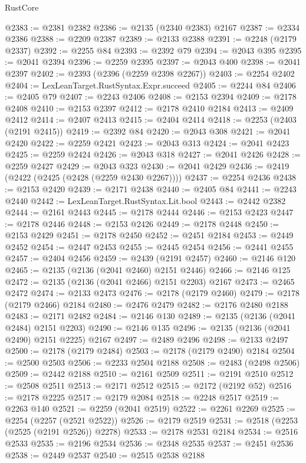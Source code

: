 \begin{lexlean}{RustCore}
\begin{coremodule}
@2383 := @2381 @2382
@2386 := @2135 (@2340 @2383) @2167
@2387 := @2334 @2386
@2388 := @2209 @2387
@2389 := @2133 @2388
@2391 := @2248 (@2179 @2337)
@2392 := @2255 @84
@2393 := @2392 @79
@2394 := @2043 @395
@2395 := @2041 @2394
@2396 := @2259 @2395
@2397 := @2043 @400
@2398 := @2041 @2397
@2402 := @2393 (@2396 (@2259 @2398 @2267))
@2403 := @2254 @2402
@2404 := LexLeanTarget.RustSyntax.Expr.succeed
@2405 := @2244 @84
@2406 := @2405 @79
@2407 := @2243 @2406
@2408 := @2153 @2394
@2409 := @2178 @2408
@2410 := @2153 @2397
@2412 := @2178 @2410 @2184
@2413 := @2409 @2412
@2414 := @2407 @2413
@2415 := @2404 @2414
@2418 := @2253 (@2403 (@2191 @2415))
@2419 := @2392 @84
@2420 := @2043 @308
@2421 := @2041 @2420
@2422 := @2259 @2421
@2423 := @2043 @313
@2424 := @2041 @2423
@2425 := @2259 @2424
@2426 := @2043 @318
@2427 := @2041 @2426
@2428 := @2259 @2427
@2429 := @2043 @323
@2430 := @2041 @2429
@2436 := @2419 (@2422 (@2425 (@2428 (@2259 @2430 @2267))))
@2437 := @2254 @2436
@2438 := @2153 @2420
@2439 := @2171 @2438
@2440 := @2405 @84
@2441 := @2243 @2440
@2442 := LexLeanTarget.RustSyntax.Lit.bool
@2443 := @2442 @2382
@2444 := @2161 @2443
@2445 := @2178 @2444
@2446 := @2153 @2423
@2447 := @2178 @2446
@2448 := @2153 @2426
@2449 := @2178 @2448
@2450 := @2153 @2429
@2451 := @2178 @2450
@2452 := @2451 @2184
@2453 := @2449 @2452
@2454 := @2447 @2453
@2455 := @2445 @2454
@2456 := @2441 @2455
@2457 := @2404 @2456
@2459 := @2439 (@2191 @2457)
@2460 := @2146 @120
@2465 := @2135 (@2136 (@2041 @2460) @2151 @2446)
@2466 := @2146 @125
@2472 := @2135 (@2136 (@2041 @2466) @2151 @2203) @2167
@2473 := @2465 @2472
@2474 := @2133 @2473
@2476 := @2178 (@2179 @2460)
@2479 := @2178 (@2179 @2466) @2184
@2480 := @2476 @2479
@2482 := @2176 @2480 @2188
@2483 := @2171 @2482
@2484 := @2146 @130
@2489 := @2135 (@2136 (@2041 @2484) @2151 @2203)
@2490 := @2146 @135
@2496 := @2135 (@2136 (@2041 @2490) @2151 @2225) @2167
@2497 := @2489 @2496
@2498 := @2133 @2497
@2500 := @2178 (@2179 @2484)
@2503 := @2178 (@2179 @2490) @2184
@2504 := @2500 @2503
@2506 := @2233 @2504 @2188
@2508 := @2483 (@2498 @2506)
@2509 := @2442 @2188
@2510 := @2161 @2509
@2511 := @2191 @2510
@2512 := @2508 @2511
@2513 := @2171 @2512
@2515 := @2172 (@2192 @52)
@2516 := @2178 @2225
@2517 := @2179 @2084
@2518 := @2248 @2517
@2519 := @2263 @140
@2521 := @2259 (@2041 @2519)
@2522 := @2261 @2269
@2525 := @2254 (@2257 (@2521 @2522))
@2526 := @2179 @2519
@2531 := @2518 (@2253 (@2525 (@2191 @2526)) @2278)
@2533 := @2178 @2531 @2184
@2534 := @2516 @2533
@2535 := @2196 @2534
@2536 := @2348 @2535
@2537 := @2451 @2536
@2538 := @2449 @2537
@2540 := @2515 @2538 @2188

\end{coremodule}
\end{lexlean}
